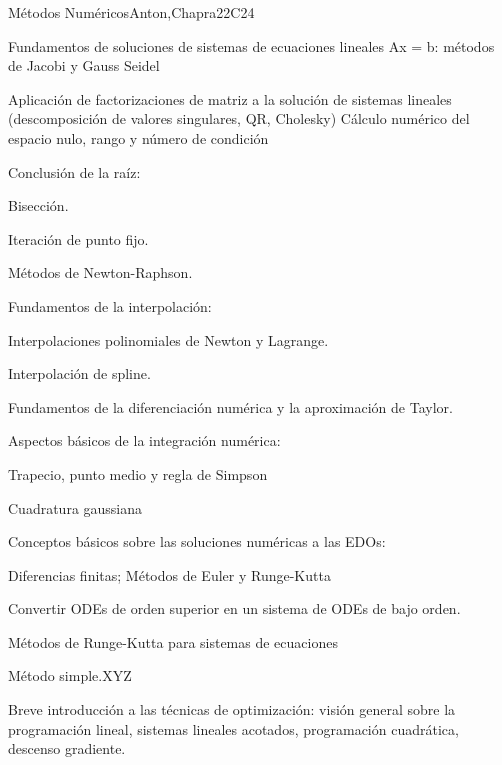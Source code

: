 \begin{syllabus}
\begin{unit}{Métodos Numéricos}{}{Anton,Chapra}{22}{C24}
   \begin{topics}
    \item Fundamentos de soluciones de sistemas de ecuaciones lineales Ax = b: métodos de Jacobi y Gauss Seidel
    \item Aplicación de factorizaciones de matriz a la solución de sistemas lineales (descomposición de valores singulares, QR, Cholesky) Cálculo numérico del espacio nulo, rango y número de condición
    \item Conclusión de la raíz:
	  \begin{subtopics}
	    \item Bisección.
	    \item Iteración de punto fijo.
	    \item Métodos de Newton-Raphson.
	  \end{subtopics}
    \item Fundamentos de la interpolación:
	  \begin{subtopics}
	    \item Interpolaciones polinomiales de Newton y Lagrange.
	    \item Interpolación de spline.
	    \end{subtopics}
    \item Fundamentos de la diferenciación numérica y la aproximación de Taylor.
    \item Aspectos básicos de la integración numérica:
	  \begin{subtopics}
	    \item Trapecio, punto medio y regla de Simpson 
	    \item Cuadratura gaussiana
	  \end{subtopics}
    \item Conceptos básicos sobre las soluciones numéricas a las EDOs:
	  \begin{subtopics}
	    \item Diferencias finitas; Métodos de Euler y Runge-Kutta
	    \item Convertir ODEs de orden superior en un sistema de ODEs de bajo orden.
	    \item Métodos de Runge-Kutta para sistemas de ecuaciones
	    \item Método simple.XYZ
	  \end{subtopics}
    \item Breve introducción a las técnicas de optimización: visión general sobre la programación lineal, sistemas lineales acotados, programación cuadrática, descenso gradiente.
    \end{topics}


\end{unit}
\end{syllabus}
